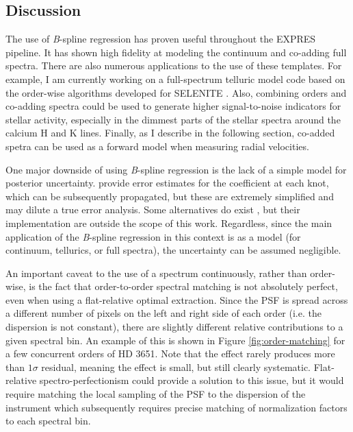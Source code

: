\subsection{Discussion}

The use of \textit{B}-spline regression has proven useful throughout the EXPRES pipeline. It has shown high fidelity at modeling the continuum and co-adding full spectra. There are also numerous applications to the use of these templates. For example, I am currently working on a full-spectrum telluric model code based on the order-wise algorithms developed for SELENITE \citep{leet_toward_2019}. Also, combining orders and co-adding spectra could be used to generate higher signal-to-noise indicators for stellar activity, especially in the dimmest parts of the stellar spectra around the calcium H and K lines. Finally, as I describe in the following section, co-added spetra can be used as a forward model when measuring radial velocities.

One major downside of using \textit{B}-spline regression is the lack of a simple model for posterior uncertainty. \citet{zechmeister_spectrum_2018} provide error estimates for the coefficient at each knot, which can be subsequently propagated, but these are extremely simplified and may dilute a true error analysis. Some alternatives do exist \citep{enting_propagating_2006, gardner_uncertainties_2003}, but their implementation are outside the scope of this work. Regardless, since the main application of the \textit{B}-spline regression in this context is as a model (for continuum, tellurics, or full spectra), the uncertainty can be assumed negligible.

An important caveat to the use of a spectrum continuously, rather than order-wise, is the fact that order-to-order spectral matching is not absolutely perfect, even when using a flat-relative optimal extraction. Since the PSF is spread across a different number of pixels on the left and right side of each order (i.e. the dispersion is not constant), there are slightly different relative contributions to a given spectral bin. An example of this is shown in Figure \ref{fig:order-matching} for a few concurrent orders of HD 3651. Note that the effect rarely produces more than $1\sigma$ residual, meaning the effect is small, but still clearly systematic. Flat-relative spectro-perfectionism could provide a solution to this issue, but it would require matching the local sampling of the PSF to the dispersion of the instrument which subsequently requires precise matching of normalization factors to each spectral bin.

